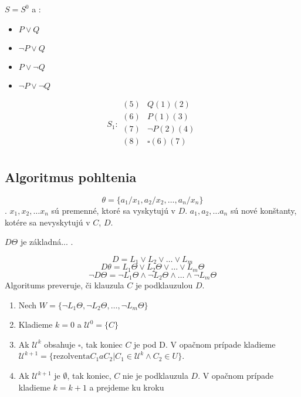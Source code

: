 \begin{priklad}
    $S=S^0$ a :
    \begin{itemize}
        \item $P\lor Q$
        \item $\neg P \lor Q$
        \item $P\lor \neg Q$
        \item $\neg P \lor \neg Q$
    \end{itemize}
    $$
    S_1:
    \begin{array}{ll}
    (5)& Q (1) (2)\\
    (6)& P (1) (3)\\
    (7)& \neg P (2) (4)\\
    (8)& \square (6) (7)\\
    \end{array}
    $$
\end{priklad}

\subsection{Algoritmus  pohltenia}

$$\theta = \{ a_1 / x_1, a_2 / x_2, \ldots, a_n / x_n \}$$. $x_1, x_2, \ldots
x_n$ sú premenné, ktoré sa vyskytujú v $D$. $a_1, a_2, \ldots a_n$ sú nové
konštanty, kotére sa nevyskytujú v $C$, $D$.

$D\Theta$ je základná... .

$$D = L_1 \lor L_2 \lor \ldots \lor L_m$$
$$D \theta = L_1\Theta \lor L_2 \Theta \lor \ldots \lor L_m \Theta$$
$$\neg D\Theta = \neg L_1 \Theta \land \neg L_2 \Theta \land \ldots \land \neg
L_m \Theta$$
Algoritums preveruje, či klauzula $C$ je podklauzulou $D$.

\begin{enumerate}
    \item Nech $W = \{ \neg L_1 \Theta, \neg L_2 \Theta, \ldots, \neg L_m
    \Theta \}$

    \item Kladieme $k=0$ a $\mathcal{U}^0 = \{ C \}$
    \item Ak $\mathcal{U}^k$ obsahuje $\square$, tak koniec $C$ je pod D. V
    opačnom prípade kladieme $\mathcal{U}^{k+1} = \{ \mbox{rezolventa} C_1 a
    C_2 | C_1 \in \mathcal{U}^{k} \land C_2 \in U\}$. 
    \item Ak $\mathcal{U}^{k+1}$ je $\emptyset$, tak koniec, $C$ nie je
    podklauzula $D$. V opačnom prípade kladieme $k=k+1$ a prejdeme ku kroku

\end{enumerate}

